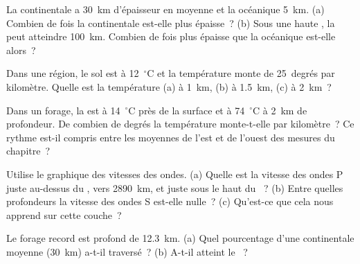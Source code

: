 \begin{exercise}[$\star\star$]\label{exo:g6:inside-the-earth:6}
La  continentale a 30~km d'épaisseur en moyenne et la 
océanique 5~km. (a) Combien de fois la  continentale est-elle plus
épaisse~? (b) Sous une haute , la  peut atteindre
100~km. Combien de fois plus épaisse que la  océanique est-elle
alors~?
\end{exercise}

\begin{exercise}[$\star\star$]\label{exo:g6:inside-the-earth:7}
Dans une région, le sol est à 12~$^\circ$C et la température monte de
25~degrés par kilomètre. Quelle est la température (a) à 1~km, (b) à
1.5~km, (c) à 2~km~?
\end{exercise}

\begin{exercise}[$\star\star$]\label{exo:g6:inside-the-earth:8}
Dans un forage, la  est à 14~$^\circ$C près de la surface et à
74~$^\circ$C à 2~km de profondeur. De combien de degrés la température
monte-t-elle par kilomètre~? Ce rythme est-il compris entre les moyennes
de l'est et de l'ouest des mesures du chapitre~?
\end{exercise}

\begin{exercise}[$\star\star$]\label{exo:g6:inside-the-earth:9}
Utilise le graphique des vitesses des ondes. (a) Quelle est la vitesse des
ondes P juste au-dessus du , vers 2890~km, et juste sous le haut du
~? (b) Entre quelles profondeurs la vitesse des ondes S est-elle
nulle~? (c) Qu'est-ce que cela nous apprend sur cette couche~?
\end{exercise}

\begin{exercise}[$\star\star$]\label{exo:g6:inside-the-earth:10}
Le forage record est profond de 12.3~km. (a) Quel pourcentage d'une 
continentale moyenne (30~km) a-t-il traversé~? (b) A-t-il atteint le
~?
\end{exercise}

